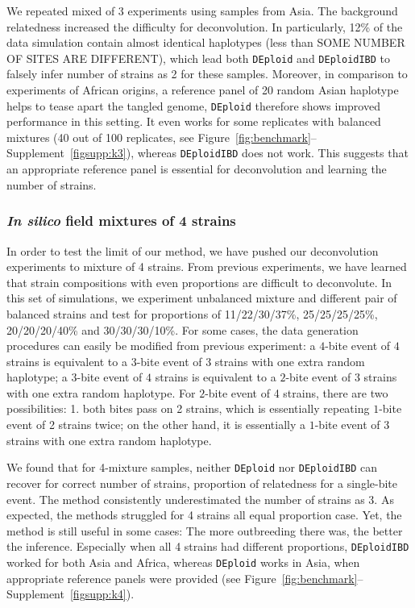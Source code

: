 \documentclass[9pt,lineno]{elife}
\begin{document}
We repeated mixed of 3 experiments using samples from Asia. The background relatedness increased the difficulty for deconvolution. In particularly, 12\% of the data simulation contain almost identical haplotypes (less than SOME NUMBER OF SITES ARE DIFFERENT), which lead both {\tt DEploid} and {\tt DEploidIBD} to falsely infer number of strains as 2 for these samples. Moreover, in comparison to experiments of African origins, a reference panel of 20 random Asian haplotype helps to tease apart the tangled genome, {\tt DEploid} therefore shows improved performance in this setting. It even works for some replicates with balanced mixtures (40 out of 100 replicates, see Figure~\ref{fig:benchmark}--Supplement~\ref*{figsupp:k3}), whereas {\tt DEploidIBD} does not work. This suggests that an appropriate reference panel is essential for deconvolution and learning the number of strains.


\subsubsection{{\it In silico} field mixtures of 4 strains}

In order to test the limit of our method, we have pushed our deconvolution experiments to mixture of 4 strains. From previous experiments, we have learned that strain compositions with even proportions are difficult to deconvolute. In this set of simulations, we experiment unbalanced mixture and different pair of balanced strains and test for proportions of 11/22/30/37\%, 25/25/25/25\%, 20/20/20/40\% and 30/30/30/10\%. For some cases, the data generation procedures can easily be modified from previous experiment: a $4$-bite event of $4$ strains is equivalent to a $3$-bite event of 3 strains with one extra random haplotype; a $3$-bite event of $4$ strains is equivalent to a $2$-bite event of 3 strains with one extra random haplotype. For $2$-bite event of 4 strains, there are two possibilities: 1. both bites pass on 2 strains, which is essentially repeating $1$-bite event of 2 strains twice; on the other hand, it is essentially a $1$-bite event of 3 strains with one extra random haplotype.

We found that for 4-mixture samples, neither {\tt DEploid} nor {\tt DEploidIBD} can recover for correct number of strains, proportion of relatedness for a single-bite event. The method consistently underestimated the number of strains as 3. As expected, the methods struggled for 4 strains all equal proportion case. Yet, the method is still useful in some cases: The more outbreeding there was, the better the inference. Especially when all 4 strains had different proportions, {\tt DEploidIBD} worked for both Asia and Africa, whereas {\tt DEploid} works in Asia, when appropriate reference panels were provided (see Figure~\ref{fig:benchmark}--Supplement~\ref*{figsupp:k4}).
\end{document}
